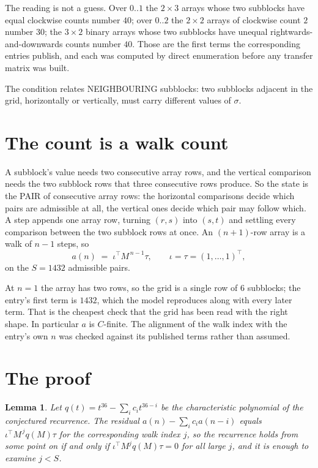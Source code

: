 \documentclass[11pt,a4paper]{article}
\theoremstyle{plain}
\newtheorem{lemma}[theorem]{Lemma}
\theoremstyle{definition}
\begin{document}
The reading is not a guess. Over $0..1$ the $2\times3$ arrays whose two subblocks have equal
clockwise counts number $40$; over $0..2$ the $2\times2$ arrays of clockwise count $2$ number
$30$; the $3\times2$ binary arrays whose two subblocks have unequal rightwards-and-downwards
counts number $40$. Those are the first terms the corresponding entries publish, and each was
computed by direct enumeration before any transfer matrix was built.

The condition relates NEIGHBOURING subblocks: two subblocks adjacent in the grid, horizontally
or vertically, must carry different values of $\sigma$.

\section{The count is a walk count}

A subblock's value needs two consecutive array rows, and the vertical
comparison needs the two subblock rows that three consecutive rows produce. So the state is the
PAIR of consecutive array rows: the horizontal comparisons decide which pairs are admissible at
all, the vertical ones decide which pair may follow which. A step appends one array row,
turning $(r,s)$ into $(s,t)$ and settling every comparison between the two subblock rows at
once. An $(n+1)$-row array is a walk of $n-1$ steps, so
\[
a(n)\;=\;\iota^{\!\top}M^{\,n-1}\tau,\qquad\iota=\tau=(1,\dots,1)^{\!\top},
\]
on the $S=1432$ admissible pairs.

At $n=1$ the array has two rows, so the grid is a single row of $6$
subblocks; the entry's first term is $1432$, which the model
reproduces along with every later term. That is the cheapest check that the grid has been read
with the right shape.
In particular $a$ is $C$-finite. The alignment of the walk index with the entry's own $n$ was
checked against its published terms rather than assumed.

\section{The proof}

\begin{lemma}\label{lem:crit}
Let $q(t)=t^{36}-\sum_i c_it^{36-i}$ be the characteristic polynomial of the
conjectured recurrence. The residual $a(n)-\sum_ic_ia(n-i)$ equals
$\iota^{\!\top}M^{\,j}q(M)\tau$ for the corresponding walk index $j$, so the recurrence
holds from some point on if and only if $\iota^{\!\top}M^{j}q(M)\tau=0$ for all large $j$,
and it is enough to examine $j<S$.
\end{lemma}
\end{document}
